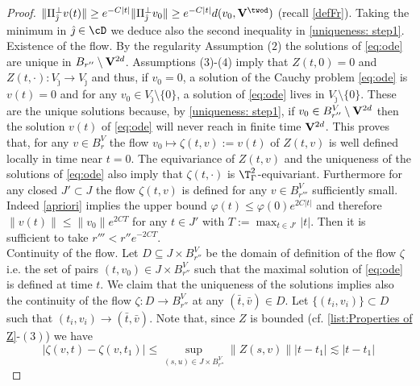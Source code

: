 \documentclass[11pt,a4paper,reqno]{article}
\numberwithin{equation}{section}
\theoremstyle{definition}
\begin{document}
\begin{appendix}
\begin{proof}
        $ \|\Pi_{\hat \jmath}^\bot v(t)\|\geq e^{-C |t|}\|\Pi_{\hat \jmath}^\bot v_0\|  \geq e^{-C |t|} d({v_0},{\bf V}^{\twod})
        $
(recall \eqref{defFr}). 
Taking the minimum in $ {\hat \jmath} \in \cD $ 
we deduce also the second inequality in \eqref{uniqueness: step1}.
\\[1mm]
        {\sc Existence of the flow.} 
        By the regularity Assumption ($2$) the solutions of 
     \eqref{eq:ode} are unique in
        $ B_{r''} \setminus {\bf V}^{2d}$. 
        Assumptions ($3$)-($4$)
imply that   $ Z(t,0) = 0 $ and $ Z(t, \cdot)  : V_{\hat \jmath } \to V_{\hat \jmath } $ 
and thus, if $ v_0 = 0 $, a solution of the Cauchy problem \eqref{eq:ode} is $ v(t) = 0 $ and for any $ v_0 \in V_{\hat \jmath } \setminus \{0\} $, 
a solution of  \eqref{eq:ode} lives in 
$ V_{\hat \jmath } \setminus \{0\} $. These are the unique solutions because, 
by \eqref{uniqueness: step1},  if $v_0 \in B_{r''}^V 
        \setminus {\bf V}^{2d} $  then the solution $ v(t) $
        of  \eqref{eq:ode} 
        will never reach in finite time  $  {\bf V}^{2d} $. 
        This proves that, for any $ v \in B_r^V $ the flow  $ v_0  \mapsto \zeta (t,v) := v(t) $ of $Z(t,v) $ is well defined locally in time near $ t = 0 $.
        The equivariance of $ Z(t, v) $ and   the uniqueness of the solutions of \eqref{eq:ode} also imply that  
        $ \zeta (t, \cdot) $ 
        is $\T^2_\Gamma$-equivariant. Furthermore for any closed  $ J' \subset J $ the flow $ \zeta (t, v) $ is defined for any $ v \in B_{r'''}^V $ sufficiently small. Indeed  \eqref{apriori} implies the upper bound $ \varphi(t) \leq  \varphi(0) e^{ 2 C |t|}  $ and therefore 
        $ \|v (t)\| \leq \| v_0 \| e^{2C T }
     $
        for any $ t \in J' $  with  $ T := \max_{t \in J'}{|t|} $. Then it is sufficient to take $ r''' < r'' e^{-2C T} $.  
        \\[1mm]
        {\sc Continuity of the flow.}
        Let $D\subseteq J\times B_{r''}^V$ be the domain of definition of the flow $\zeta$ i.e. the set of pairs $(t,v_0)\in J\times B_{r''}^V$ such that the maximal solution of \eqref{eq:ode} is defined at time $t$. We claim that the uniqueness of the solutions implies also the  continuity of the flow $\zeta:D\to B_{r''}^V$ at any $(\bar t, \bar v)\in D$. Let $\{(t_i, v_i)\} \subset D $ such that $(t_i, v_i)\to (\bar t, \bar v)$.
        Note that, since $ Z $ is bounded (cf. \eqref{list:Properties of Z}-$(3)$) we have
        \begin{equation}\label{eq:lip}
            |\zeta(v,t)-\zeta(v,t_1)|\leq \sup_{(s,u)\in J\times B_{r''}^V}\|Z(s,v)\| |t-t_1|  \lesssim |t-t_1| \,

\end{equation}
\end{proof}
\end{appendix}
\end{document}
